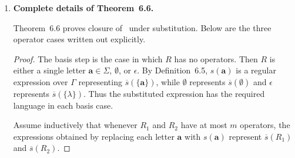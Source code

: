 \begin{enumerate}[{6.}1.]
\begin{enumerate}[(a)]
	  \item With terminal sets $X_1$ and $X_2$ from the two states,
	  \[
	  X_1=\pmb{a}X_1\cup\pmb{a}X_2,\qquad
	  X_2=\epsilon\cup(\pmb{a}\cup\pmb{b})X_1.
	  \]
	  Substitute the second equation into the first:
	  \[
	  X_1=\pmb{a}X_1\cup\pmb{a}(\epsilon\cup(\pmb{a}\cup\pmb{b})X_1)
	     =\pmb{a}\cup(\pmb{a}\cup\pmb{aa}\cup\pmb{ab})X_1.
	  \]
	  Therefore, by Theorem~6.1,
	  \[
	  X_1=(\pmb{a}\cup\pmb{aa}\cup\pmb{ab})^*\pmb{a}.
	  \]

	  \item With $X_i$ the terminal set from $S_i$,
	  \[
	  X_0=\pmb{a}X_1,\qquad
	  X_1=X_0\cup\pmb{b}X_2,\qquad
	  X_2=\pmb{c}X_3,\qquad
	  X_3=\epsilon\cup X_1.
	  \]
	  Hence
	  \[
	  X_1=X_0\cup\pmb{bc}\cup\pmb{bc}X_1
	      =\pmb{a}X_1\cup\pmb{bc}\cup\pmb{bc}X_1,
	  \]
	  so
	  \[
	  X_1=(\pmb{a}\cup\pmb{bc})^*\pmb{bc}.
	  \]
	  Since $X_0=\pmb{a}X_1$,
	  \[
	  X_0=\pmb{a}(\pmb{a}\cup\pmb{bc})^*\pmb{bc}
	      =\pmb{a}\pmb{a}^*\pmb{b}\pmb{c}(\pmb{a}^*\pmb{b}\pmb{c})^*.
	  \]

	  \item With $X_i$ the terminal set from $S_i$,
	  \[
	  X_0=\epsilon\cup\pmb{a}X_1,\qquad
	  X_1=\pmb{a}X_0\cup\pmb{c}X_2\cup\pmb{b}X_3,\qquad
	  X_2=\pmb{c}X_1,\qquad
	  X_3=\pmb{b}X_1.
	  \]
	  Substituting for $X_2$ and $X_3$ gives
	  \[
	  X_1=\pmb{a}X_0\cup(\pmb{bb}\cup\pmb{cc})X_1,
	  \]
	  so
	  \[
	  X_1=(\pmb{bb}\cup\pmb{cc})^*\pmb{a}X_0.
	  \]
	  Then
	  \[
	  X_0=\epsilon\cup\pmb{a}(\pmb{bb}\cup\pmb{cc})^*\pmb{a}X_0,
	  \]
	  and therefore
	  \[
	  X_0=\bigl(\pmb{a}(\pmb{bb}\cup\pmb{cc})^*\pmb{a}\bigr)^*.
	  \]
	\end{enumerate}

\item \textbf{Complete details of Theorem~6.6.}

Theorem~6.6 proves closure of \RSIG\ under substitution.  Below are the three
operator cases written out explicitly.

\begin{proof}
The basis step is the case in which $R$ has no operators.  Then $R$ is either a
single letter $\pmb{a}\in\Sigma$, $\emptyset$, or $\epsilon$.  By Definition~6.5,
$s(\pmb{a})$ is a regular expression over $\Gamma$ representing
$\overline{s}(\{\pmb{a}\})$, while $\emptyset$ represents
$\overline{s}(\emptyset)$ and $\epsilon$ represents
$\overline{s}(\{\lambda\})$.  Thus the substituted expression has the required
language in each basis case.

Assume inductively that whenever $R_1$ and $R_2$ have at most $m$ operators, the
expressions obtained by replacing each letter $\pmb{a}$ with $s(\pmb{a})$
represent $\overline{s}(R_1)$ and $\overline{s}(R_2)$.


\end{proof}
\end{enumerate}
